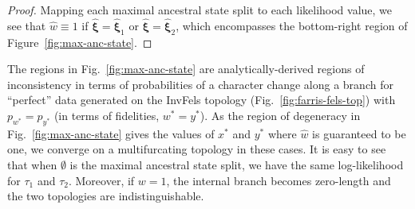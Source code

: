 \begin{proof}
Mapping each maximal ancestral state split to each likelihood value, we see that $\hat{w}\equiv 1$ if $\hat{\boldsymbol\xi}=\hat{\boldsymbol\xi}_1$ or $\hat{\boldsymbol\xi}=\hat{\boldsymbol\xi}_2$, which encompasses the bottom-right region of Figure~\ref{fig:max-anc-state}.
\end{proof}

The regions in Fig.~\ref{fig:max-anc-state} are analytically-derived regions of inconsistency in terms of probabilities of a character change along a branch for ``perfect'' data generated on the InvFels topology (Fig.~\ref{fig:farris-fels-top}) with $p_{w^*} = p_{y^*}$ (in terms of fidelities, $w^*=y^*$).
As the region of degeneracy in Fig.~\ref{fig:max-anc-state} gives the values of $x^*$ and $y^*$ where $\hat{w}$ is guaranteed to be one, we converge on a multifurcating topology in these cases.
It is easy to see that when $\emptyset$ is the maximal ancestral state split, we have the same log-likelihood for $\tau_1$ and $\tau_2$.
Moreover, if $w=1$, the internal branch becomes zero-length and the two topologies are indistinguishable.

